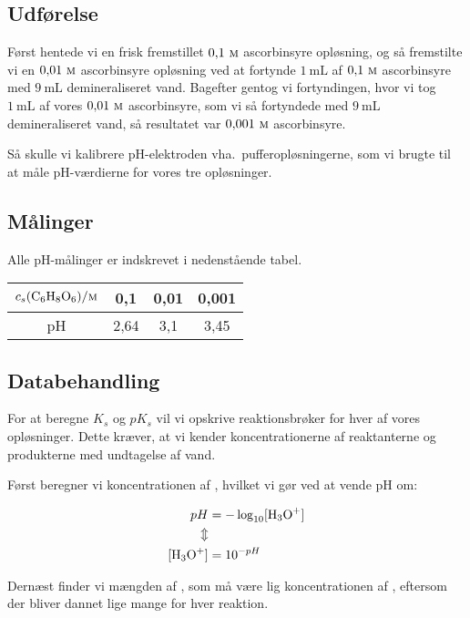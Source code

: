 \subsection*{Udførelse}
Først hentede vi en frisk fremstillet $0{,}1\ \textsc{m}$ ascorbinsyre opløsning,
og så fremstilte vi en $0{,}01\ \textsc{m}$ ascorbinsyre opløsning ved at fortynde
$1\ \unit{\milli\liter}$ af $0{,}1\ \textsc{m}$ ascorbinsyre med $9\ \unit{\milli\liter}$ demineraliseret vand.
Bagefter gentog vi fortyndingen,
hvor vi tog $1\ \unit{\milli\liter}$ af vores $0{,}01\ \textsc{m}$ ascorbinsyre,
som vi så fortyndede med $9\ \unit{\milli\liter}$ demineraliseret vand,
så resultatet var $0{,}001 \ \textsc{m}$ ascorbinsyre.

Så skulle vi kalibrere pH-elektroden vha.~pufferopløsningerne, som vi brugte til at måle pH-værdierne for vores tre opløsninger.

\subsection*{Målinger}
Alle pH-målinger er indskrevet i nedenstående tabel.

\begin{table}[h]
    \centering
    \begin{tabular}{|c|c|c|c|}
    \hline
    $c_s(\ce{C6H8O6})/\textsc{m}$ & 0{,}1 & 0{,}01 & 0{,}001 \\ \hline
    pH & 2{,}64 & 3{,}1 & 3{,}45 \\ \hline
    \end{tabular}
\end{table}

\subsection*{Databehandling}
For at beregne $K_s$ og $pK_s$ vil vi opskrive reaktionsbrøker for hver af vores opløsninger.
Dette kræver, at vi kender koncentrationerne af reaktanterne og produkterne med undtagelse af vand.

Først beregner vi koncentrationen af , hvilket vi gør ved at vende pH om:

\begin{align*}
    pH &=-\log_{10}[\ce{H3O+}]
    \\
    \Updownarrow
    \\
    [\ce{H3O+}] &=10^{-pH}
\end{align*}

Dernæst finder vi mængden af , som må være lig koncentrationen af , eftersom der bliver dannet lige mange for hver reaktion.

